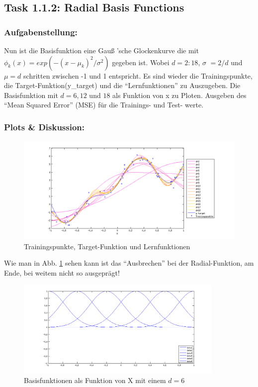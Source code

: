 \subsection{Task 1.1.2: Radial Basis Functions}


\subsubsection{Aufgabenstellung:}
Nun ist die Basisfunktion eine Gau\ss{} 'sche Glockenkurve die mit $\phi_k(x) = exp(-(x-\mu_k)^2 /\sigma^2 )$ gegeben ist.
Wobei $d=2:18$, $\sigma$ $= 2/d$ und $\mu =d$ schritten zwischen -1 und 1 entspricht.
Es sind wieder  die Trainingspunkte, die Target-Funktion(y\_target) und die ``Lernfunktionen'' zu Auszugeben.
Die Basisfunktion mit $d=6,12$ und $18$ als Funktion von x zu Ploten.
Ausgeben des ``Mean Squared Error'' (MSE) für die Trainings- und Test- werte.



\subsubsection{Plots \& Diskussion:}


\begin{figure}[hp!]
\begin{center}
 \includegraphics[width=1\textwidth]{./figures/RBF_learn}
 \caption[Trainingspunkte, Target-Funktion und Lernfunktionen]{Trainingspunkte, Target-Funktion und Lernfunktionen}
\label{fig:RBF_learn}
\end{center}
\end{figure}
Wie man in Abb. \ref{fig:RBF_learn} sehen kann ist das ``Ausbrechen'' bei der Radial-Funktion, am Ende, bei weitem nicht so ausgeprägt!

\clearpage
\begin{figure}[hp!]
\begin{center}
 \includegraphics[width=10cm]{./figures/RBF_6}
 \caption[Basisfunktionen als Funktion von X (d=6)]{Basisfunktionen als Funktion von X mit einem $d=6$}
\label{fig:RBF_6}
\end{center}
\end{figure}

